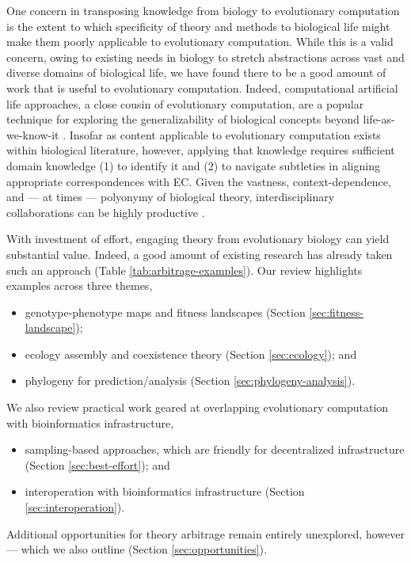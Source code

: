 One concern in transposing knowledge from biology to evolutionary computation is the extent to which specificity of theory and methods to biological life might make them poorly applicable to evolutionary computation.
While this is a valid concern, owing to existing needs in biology to stretch abstractions across vast and diverse domains of biological life, we have found there to be a good amount of work that is useful to evolutionary computation.
Indeed, computational artificial life approaches, a close cousin of evolutionary computation, are a popular technique for exploring the generalizability of biological concepts beyond life-as-we-know-it \citep{cleland2013general,langton1989artificial,pennock2007models}. %
Insofar as content applicable to evolutionary computation exists within biological literature, however, applying that knowledge requires sufficient domain knowledge (1) to identify it and (2) to navigate subtleties in aligning appropriate correspondences with EC.
Given the vastness, context-dependence, and --- at times --- polyonymy of biological theory, interdisciplinary collaborations can be highly productive \citep{goodman2020evolution}.

With investment of effort, engaging theory from evolutionary biology can yield substantial value.
Indeed, a good amount of existing research has already taken such an approach (Table \ref{tab:arbitrage-examples}).
Our review highlights examples across three themes,
\begin{itemize}
  \item genotype-phenotype maps and fitness landscapes (Section \ref{sec:fitness-landscape});
  \item ecology assembly and coexistence theory (Section \ref{sec:ecology}); and
  \item phylogeny for prediction/analysis (Section \ref{sec:phylogeny-analysis}).
\end{itemize}
We also review practical work geared at overlapping evolutionary computation with bioinformatics infrastructure,
\begin{itemize}
  \item sampling-based approaches, which are friendly for decentralized infrastructure (Section \ref{sec:best-effort}); and
  \item interoperation with bioinformatics infrastructure (Section \ref{sec:interoperation}).
\end{itemize}
Additional opportunities for theory arbitrage remain entirely unexplored, however --- which we also outline (Section \ref{sec:opportunities}).

